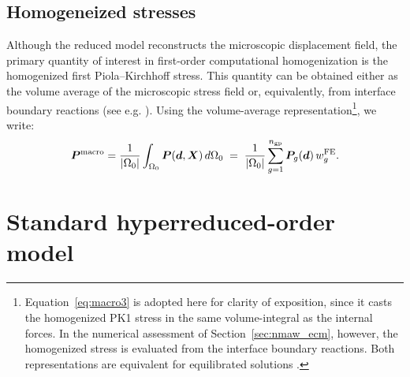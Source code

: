 \documentclass[11pt,a4paper]{article}
\begin{document}
\subsection{Homogeneized stresses}
 \label{subsec:homogenized_PK1}



Although the reduced model reconstructs the microscopic displacement field, the
primary quantity of interest in first-order computational homogenization is the
homogenized first Piola--Kirchhoff stress. This quantity can be obtained either
as the volume average of the microscopic stress field or, equivalently, from interface
boundary reactions (see e.g. \cite{miehe1999computational}). Using the volume-average representation\footnote{  Equation~\eqref{eq:macro3} is adopted here for clarity of exposition, since it casts the homogenized PK1 stress in the same volume-integral as the internal forces. In the numerical assessment of Section~\ref{sec:nmaw_ecm}, however, the homogenized stress is evaluated from the interface boundary reactions. Both representations are equivalent for equilibrated solutions \label{footnote:1}.}, we write:
\begin{equation}
\label{eq:macro3}
    \bm{P}^{\mathrm{macro}}
    =
    \frac{1}{|\Omega_0|}
    \int_{\Omega_0} \boldsymbol{P}(\bm{d},\bm{X}) \, d\Omega_0
    \;=\;
    \frac{1}{|\Omega_0|}
    \sum_{g=1}^{n_{\mathrm{gp}}}
    \boldsymbol{P}_g(\bm{d})\,w^{\mathrm{FE}}_{g}.
\end{equation}



%




\section{Standard hyperreduced-order model }
 \label{sec:standard_ROM}
\end{document}

